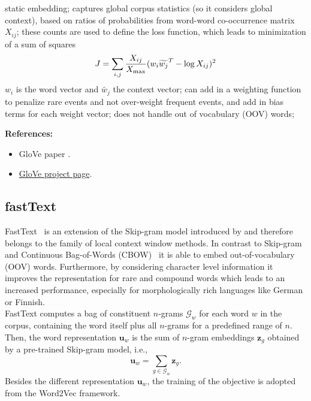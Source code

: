 \documentclass[11pt, a4paper]{amsart}
\begin{document}
{
	\color{blue}
		
	static embedding;
	captures global corpus statistics (so it considers global context), based on ratios of probabilities from word-word co-occurrence matrix $X_{ij}$;
	these counts are used to define the loss function, which leads to minimization of a sum of squares
	\begin{equation*}
	    J = \sum_{i, j} \frac{X_{ij}}{X_{\textup{max}}}
	    (w_{i} \widetilde{w_{j}}^{T} - \log X_{ij})^{2}
	\end{equation*}
	$w_{i}$ is the word vector and $\widetilde{w_{j}}$ the context vector;
	can add in a weighting function to penalize rare events and not over-weight frequent events, and add in bias terms for each weight vector;
	does not handle out of vocabulary (OOV) words;
}

\noindent \textbf{References:}
\begin{itemize}
	\item GloVe paper \cite{pennington-etal-2014-glove}.
	\item \href{https://nlp.stanford.edu/projects/glove/}{GloVe project page}.
\end{itemize}

\subsection{fastText}

FastText~\cite{DBLP:journals/corr/BojanowskiGJM16} is an extension of the Skip-gram model introduced by \cite{DBLP:journals/corr/MikolovSCCD13} and therefore belongs to the family of local context window methods. In contrast to Skip-gram and Continuous Bag-of-Words (CBOW)~\cite{DBLP:journals/corr/MikolovSCCD13} it is able to embed out-of-vocabulary (OOV) words. Furthermore, by considering character level information it improves the representation for rare and compound words which leads to an increased performance, especially for morphologically rich languages like German or Finnish.\\

FastText computes a bag of constituent $n$-grams $\mathcal{G}_w$ for each word $w$ in the corpus, containing the word itself plus all $n$-grams for a predefined range of $n$. Then, the word representation $\textbf{u}_w$ is the sum of $n$-gram embeddings $\textbf{z}_g$ obtained by a pre-trained Skip-gram model, i.e.,
\begin{equation}
	\textbf{u}_w = \sum_{g \in \mathcal{G}_w} \textbf{z}_g.
\end{equation}
Besides the different representation $\textbf{u}_w$, the training of the objective is adopted from the Word2Vec framework.\\
\end{document}
